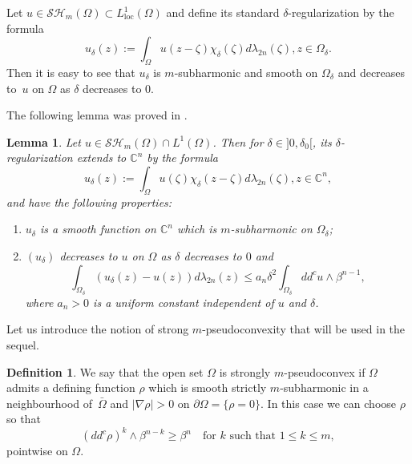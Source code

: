 \documentclass[JEP,XML,SOM,Unicode]{cedram}
\newcommand{\loc}{\mathrm{loc}}
\newtheorem{lemma}[theorem]{Lemma}
\theoremstyle{definition}
\newtheorem{definition}[theorem]{Definition}
\renewcommand{\C}{\mathbb{C}}
\begin{document}
Let $u \in \mathcal{SH}_m (\Omega) \subset L^1_{\loc} (\Omega)$ and define its standard $\delta$-regularization by the formula%
\begin{equation} \label{eq:reg}
{ u}_{\delta} (z):= \int_{\Omega} u (z - \zeta) \chi_{\delta} (\zeta) d \lambda_{2n} (\zeta), z \in \Omega_{\delta}.
\end{equation}
Then it is easy to see that $ {u}_{\delta}$ is $m$-subharmonic and smooth on $\Omega_{\delta}$ and decreases to~$u$ on $\Omega$ as $\delta $ decreases to $0$.

The following lemma was proved in \cite{GKZ08}.

\begin{lemma} \label{lem:Poisson-Jensen}
Let $u \in \mathcal{SH}_m (\Omega) \cap L^{1} (\Omega)$. Then for $\delta\in{}]0,\delta_0[$, its $\delta$-regularization extends to $\C^n$ by the formula
\begin{equation} \label{eq:regularization}
{ u}_{\delta} (z):= \int_{\Omega} u (\zeta) \chi_{\delta} (z - \zeta) d \lambda_{2n} (\zeta), z \in \C^n,
\end{equation}
and have the following properties:
\begin{enumerate}
\item
$ { u}_{\delta}$ is a smooth function on $\C^n$ which is $m$-subharmonic on $\Omega_\delta$;

\item
$({u}_\delta)$ decreases to $u$ on $\Omega$ as $\delta $ decreases to $0$ and
\[
\int_{\Omega_\delta} ( { u}_{\delta} (z) - u(z)) d\lambda_{2 n}(z) \leq a_n \delta^2 \int_{\Omega_\delta} dd^c u \wedge \beta^{n - 1},
\]
where $a_n > 0$ is a uniform constant independent of $u$ and $\delta$.
\end{enumerate}
\end{lemma}

Let us introduce the notion of strong $m$-pseudoconvexity that will be used in the sequel.

\begin{definition} We say that the open set $\Omega$ is strongly $m$-pseudoconvex if $\Omega$ admits a defining function $\rho$ which is smooth strictly $m$-subharmonic in a neighbourhood of~$\bar \Omega$ and $\vert \nabla \rho\vert > 0$ on $\partial \Omega = \{\rho = 0\}$. In this case we can choose $\rho $ so that
\begin{equation} \label{eq:stronpconvexity}
(dd^c \rho)^k \wedge \beta^{n - k} \geq \beta^n \quad \text{for $k$ such that }1 \leq k \leq m,
\end{equation}
pointwise on $\Omega$.
\end{definition}
\end{document}
